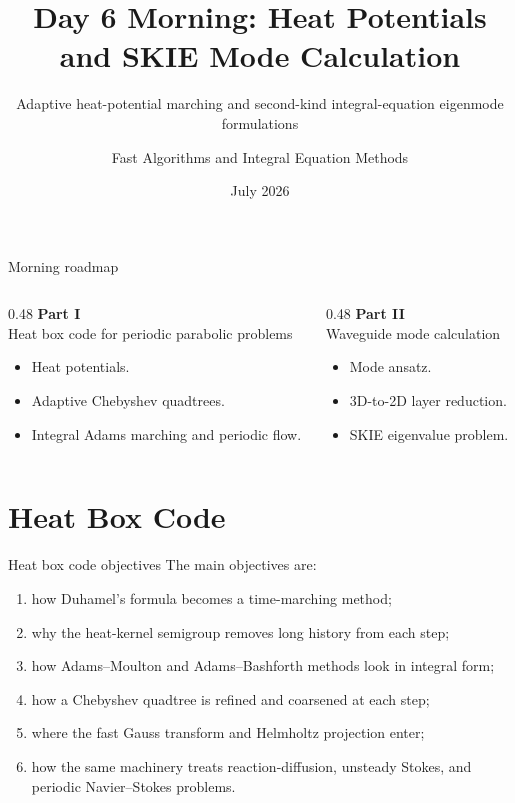 \documentclass[aspectratio=169,10pt]{beamer}
\title{Day 6 Morning: Heat Potentials and SKIE Mode Calculation}
\subtitle{Adaptive heat-potential marching and second-kind integral-equation eigenmode formulations}
\author{Fast Algorithms and Integral Equation Methods}
\institute{AMSS Summer Course}
\date{July 2026}
\begin{document}
\begin{frame}
  \titlepage
\end{frame}

\begin{frame}{Morning roadmap}
\footnotesize
\begin{columns}[T,totalwidth=\textwidth]
\begin{column}{0.48\textwidth}
\textbf{Part I}\\
Heat box code for periodic parabolic problems
\begin{itemize}
  \item Heat potentials.
  \item Adaptive Chebyshev quadtrees.
  \item Integral Adams marching and periodic flow.
\end{itemize}
\end{column}
\begin{column}{0.48\textwidth}
\textbf{Part II}\\
Waveguide mode calculation
\begin{itemize}
  \item Mode ansatz.
  \item 3D-to-2D layer reduction.
  \item SKIE eigenvalue problem.
\end{itemize}
\end{column}
\end{columns}
\end{frame}

\section{Heat Box Code}

\begin{frame}{Heat box code objectives}
\small
The main objectives are:
\begin{enumerate}
  \item how Duhamel's formula becomes a time-marching method;
  \item why the heat-kernel semigroup removes long history from each step;
  \item how Adams--Moulton and Adams--Bashforth methods look in integral form;
  \item how a Chebyshev quadtree is refined and coarsened at each step;
  \item where the fast Gauss transform and Helmholtz projection enter;
  \item how the same machinery treats reaction-diffusion, unsteady Stokes, and
  periodic Navier--Stokes problems.
\end{enumerate}
\end{frame}
\end{document}
